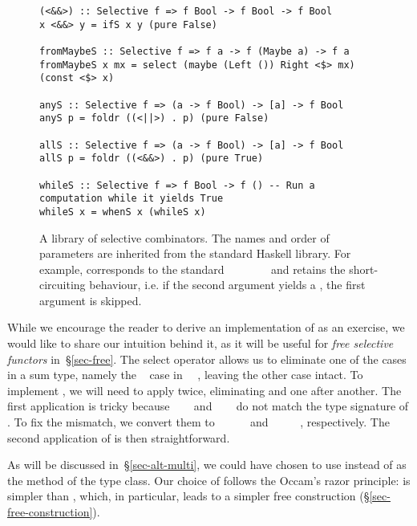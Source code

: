 {\begin{figure}
\begin{verbatim}
(<&&>) :: Selective f => f Bool -> f Bool -> f Bool
x <&&> y = ifS x y (pure False)

fromMaybeS :: Selective f => f a -> f (Maybe a) -> f a
fromMaybeS x mx = select (maybe (Left ()) Right <$> mx) (const <$> x)

anyS :: Selective f => (a -> f Bool) -> [a] -> f Bool
anyS p = foldr ((<||>) . p) (pure False)

allS :: Selective f => (a -> f Bool) -> [a] -> f Bool
allS p = foldr ((<&&>) . p) (pure True)

whileS :: Selective f => f Bool -> f () -- Run a computation while it yields True
whileS x = whenS x (whileS x)
\end{verbatim}
\caption{A library of selective combinators. The names and order of parameters
are inherited from the standard Haskell library. For example, 
corresponds to the standard
~\hs{::}~~\hs{->}~~~\hs{->}~ and
retains the short-circuiting behaviour, i.e. if the second argument yields a
, the first argument is skipped.}
\label{fig-library}
\end{figure}


\noindent
While we encourage the reader to derive an implementation of  as an
exercise, we would like to share our intuition behind it, as it will be useful
for \emph{free selective functors} in~\S\ref{sec-free}. The select operator
allows us to eliminate one of the cases in a sum type, namely the
~ case in ~~, leaving the other case
intact. To implement , we will need to apply  twice,
eliminating  and  one after another. The first application is tricky
because ~~~ and
~\hs{(}~\hs{->}~ do not match the type signature of .
To fix the mismatch, we convert them to
~~~\hs{(}~~ and
~\hs{(}~\hs{->}~~~, respectively. The second
application of  is then straightforward.

As will be discussed in~\S\ref{sec-alt-multi}, we could have chosen to use
 instead of  as the method of the  type
class. Our choice of  follows the Occam's razor principle:
 is simpler than , which, in particular, leads to a
simpler free construction (\S\ref{sec-free-construction}).

}
